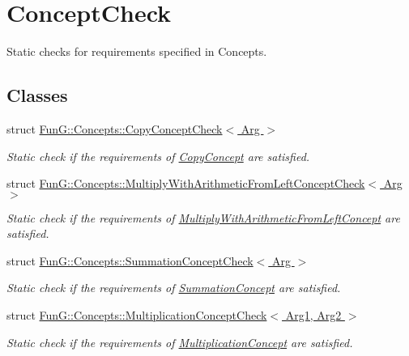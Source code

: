 \hypertarget{group__ConceptCheck}{\section{Concept\-Check}
\label{group__ConceptCheck}
}


Static checks for requirements specified in Concepts.  


\subsection*{Classes}
\begin{DoxyCompactItemize}
\item 
struct \hyperlink{structFunG_1_1Concepts_1_1CopyConceptCheck}{Fun\-G\-::\-Concepts\-::\-Copy\-Concept\-Check$<$ Arg $>$}
\begin{DoxyCompactList}\small\item\em Static check if the requirements of \hyperlink{structFunG_1_1Concepts_1_1CopyConcept}{Copy\-Concept} are satisfied. \end{DoxyCompactList}\item 
struct \hyperlink{structFunG_1_1Concepts_1_1MultiplyWithArithmeticFromLeftConceptCheck}{Fun\-G\-::\-Concepts\-::\-Multiply\-With\-Arithmetic\-From\-Left\-Concept\-Check$<$ Arg $>$}
\begin{DoxyCompactList}\small\item\em Static check if the requirements of \hyperlink{structFunG_1_1Concepts_1_1MultiplyWithArithmeticFromLeftConcept}{Multiply\-With\-Arithmetic\-From\-Left\-Concept} are satisfied. \end{DoxyCompactList}\item 
struct \hyperlink{structFunG_1_1Concepts_1_1SummationConceptCheck}{Fun\-G\-::\-Concepts\-::\-Summation\-Concept\-Check$<$ Arg $>$}
\begin{DoxyCompactList}\small\item\em Static check if the requirements of \hyperlink{structFunG_1_1Concepts_1_1SummationConcept}{Summation\-Concept} are satisfied. \end{DoxyCompactList}\item 
struct \hyperlink{structFunG_1_1Concepts_1_1MultiplicationConceptCheck}{Fun\-G\-::\-Concepts\-::\-Multiplication\-Concept\-Check$<$ Arg1, Arg2 $>$}
\begin{DoxyCompactList}\small\item\em Static check if the requirements of \hyperlink{structFunG_1_1Concepts_1_1MultiplicationConcept}{Multiplication\-Concept} are satisfied. \end{DoxyCompactList}\item 

\end{DoxyCompactItemize}
